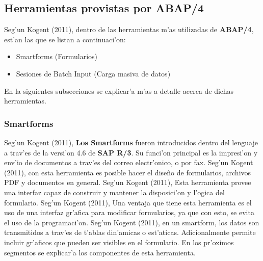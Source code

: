 	
\subsection{Herramientas provistas por ABAP/4}
	Seg'un Kogent (2011), dentro de las herramientas m'as utilizadas de \textbf{ABAP/4}, est'an las que se listan a continuaci'on:
\begin{itemize}
\item Smartforms (Formularios)
\item Sesiones de Batch Input (Carga masiva de datos)
\end{itemize} 
	En la siguientes subsecciones se explicar'a m'as a detalle acerca de dichas herramientas.
	
\subsubsection{Smartforms}
	Seg'un Kogent (2011), \textbf{Los Smartforms} fueron introducidos dentro del lenguaje a trav'es de la versi'on 4.6 de \textbf{SAP R/3}. Su funci'on principal es la impresi'on y env'io de documentos a trav'es del correo electr'onico, o por fax. 
\newline
\newline
\indent Seg'un Kogent (2011), con esta herramienta es posible hacer el dise\~no de formularios, archivos PDF y documentos en general. 
\newline
\newline
\indent Seg'un Kogent (2011), Esta herramienta provee una interfaz capaz de construir y mantener la disposici'on y l'ogica del formulario.
\newline
\newline
\indent Seg'un Kogent (2011), Una ventaja que tiene esta herramienta es el uso  de una interfaz gr'afica para modificar formularios, ya que con esto, se evita el uso de la programaci'on.
\newline 
\newline
\indent Seg'un Kogent (2011), en un smartform, los datos son transmitidos a trav'es de t'ablas din'amicas o est'aticas. Adicionalmente permite incluir gr'aficos que pueden ser visibles en el formulario. En los pr'oximos segmentos se explicar'a los componentes de esta herramienta.
	
